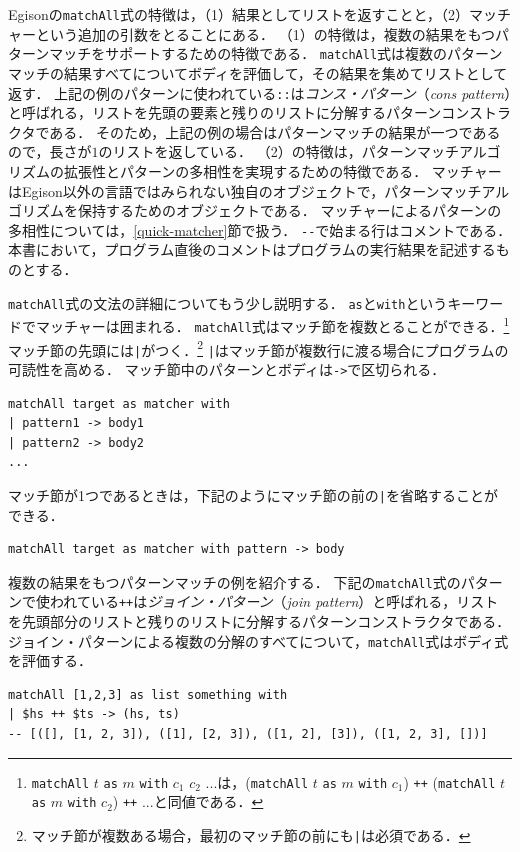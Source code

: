 Egisonの\lstinline{matchAll}式の特徴は，（1）結果としてリストを返すことと，（2）マッチャーという追加の引数をとることにある．
（1）の特徴は，複数の結果をもつパターンマッチをサポートするための特徴である．
\lstinline{matchAll}式は複数のパターンマッチの結果すべてについてボディを評価して，その結果を集めてリストとして返す．
上記の例のパターンに使われている\lstinline{::}は\emph{コンス・パターン}（\emph{cons pattern}）と呼ばれる，リストを先頭の要素と残りのリストに分解するパターンコンストラクタである．
そのため，上記の例の場合はパターンマッチの結果が一つであるので，長さが$1$のリストを返している．
（2）の特徴は，パターンマッチアルゴリズムの拡張性とパターンの多相性を実現するための特徴である．
マッチャーはEgison以外の言語ではみられない独自のオブジェクトで，パターンマッチアルゴリズムを保持するためのオブジェクトである．
マッチャーによるパターンの多相性については，\ref{quick-matcher}節で扱う．
\lstinline{--}で始まる行はコメントである．
本書において，プログラム直後のコメントはプログラムの実行結果を記述するものとする．

\lstinline{matchAll}式の文法の詳細についてもう少し説明する．
\lstinline{as}と\lstinline{with}というキーワードでマッチャーは囲まれる．
\lstinline{matchAll}式はマッチ節を複数とることができる．\footnote{\lstinline{matchAll} $t$ \lstinline{as} $m$ \lstinline{with} $c_1$ $c_2$ $...$は，(\lstinline{matchAll} $t$ \lstinline{as} $m$ \lstinline{with} $c_1$) \lstinline{++} (\lstinline{matchAll} $t$ \lstinline{as} $m$ \lstinline{with} $c_2$) \lstinline{++} $...$と同値である．}
マッチ節の先頭には\lstinline{|}がつく．\footnote{マッチ節が複数ある場合，最初のマッチ節の前にも\lstinline{|}は必須である．}
\lstinline{|}はマッチ節が複数行に渡る場合にプログラムの可読性を高める．
マッチ節中のパターンとボディは\lstinline{->}で区切られる．
\begin{lstlisting}[language=egison,numbers=none]
matchAll target as matcher with
| pattern1 -> body1
| pattern2 -> body2
...
\end{lstlisting}
マッチ節が1つであるときは，下記のようにマッチ節の前の\lstinline{|}を省略することができる．
\begin{lstlisting}[language=egison,numbers=none]
matchAll target as matcher with pattern -> body
\end{lstlisting}

複数の結果をもつパターンマッチの例を紹介する．
下記の\lstinline{matchAll}式のパターンで使われている\lstinline{++}は\emph{ジョイン・パターン}（\emph{join pattern}）と呼ばれる，リストを先頭部分のリストと残りのリストに分解するパターンコンストラクタである．
ジョイン・パターンによる複数の分解のすべてについて，\lstinline{matchAll}式はボディ式を評価する．
\begin{lstlisting}[language=egison,numbers=none]
matchAll [1,2,3] as list something with
| $hs ++ $ts -> (hs, ts)
-- [([], [1, 2, 3]), ([1], [2, 3]), ([1, 2], [3]), ([1, 2, 3], [])]
\end{lstlisting}

